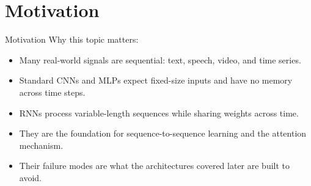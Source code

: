 \section{Motivation}
\begin{frame}{Motivation}
    \large Why this topic matters:
        \begin{itemize}
            \item Many real-world signals are sequential: text, speech, video, and time series.
            \item Standard CNNs and MLPs expect fixed-size inputs and have no memory across time steps.
            \item RNNs process variable-length sequences while sharing weights across time.
            \item They are the foundation for sequence-to-sequence learning and the attention mechanism.
            \item Their failure modes are what the architectures covered later are built to avoid.
        \end{itemize}
\end{frame}
